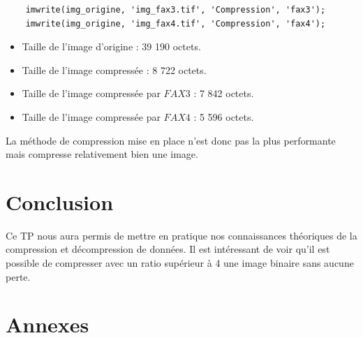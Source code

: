 \documentclass[11pt]{article}
\begin{document}
  \begin{lstlisting}
  	imwrite(img_origine, 'img_fax3.tif', 'Compression', 'fax3');
  	imwrite(img_origine, 'img_fax4.tif', 'Compression', 'fax4');
  \end{lstlisting}
  
  
  \begin{itemize}
  	\item Taille de l'image d'origine : 39 190 octets.
  	\item Taille de l'image compressée : 8 722 octets.
  	\item Taille de l'image compressée par $FAX3$ : 7 842 octets.
  	\item Taille de l'image compressée par $FAX4$ : 5 596 octets.
  \end{itemize}
  
  La méthode de compression mise en place n'est donc pas la plus performante mais compresse relativement bien une image.

\newpage
\section{Conclusion}

  Ce TP nous aura permis de mettre en pratique nos connaissances théoriques de la compression et décompression de données. Il est intéressant de voir qu'il est possible de compresser avec un ratio supérieur à 4 une image binaire sans aucune perte.

\section{Annexes}
\end{document}
